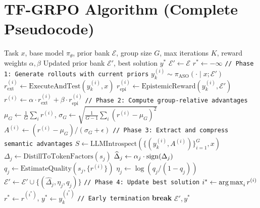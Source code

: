\section{TF-GRPO Algorithm (Complete Pseudocode)}

\label{app:algorithm}

\begin{algorithm}[H]
\caption{Training-Free GRPO with PoE Decoding}
\label{alg:tfgrpo}
\begin{algorithmic}[1]
\Require Task $x$, base model $\pi_\theta$, prior bank $\mathcal{E}$,
         group size $G$, max iterations $K$, reward weights $\alpha, \beta$
\Ensure Updated prior bank $\mathcal{E}'$, best solution $y^*$
\State $\mathcal{E}' \gets \mathcal{E}$
\State $r^* \gets -\infty$
    \State \texttt{// Phase 1: Generate rollouts with current priors}
        \State $y^{(i)}_k \sim \pi_{\text{ASO}}(\cdot \mid x; \mathcal{E}')$
        \State $r_{\text{ext}}^{(i)} \gets \text{ExecuteAndTest}(y^{(i)}_k, x)$
        \State $r_{\text{epi}}^{(i)} \gets \text{EpistemicReward}(y^{(i)}_k, \mathcal{E}')$
        \State $r^{(i)} \gets \alpha \cdot r_{\text{ext}}^{(i)} + \beta \cdot r_{\text{epi}}^{(i)}$
    \EndFor
    \State \texttt{// Phase 2: Compute group-relative advantages}
    \State $\mu_G \gets \frac{1}{G}\sum_i r^{(i)}$, \quad
           $\sigma_G \gets \sqrt{\frac{1}{G-1}\sum_i (r^{(i)} - \mu_G)^2}$
        \State $A^{(i)} \gets (r^{(i)} - \mu_G) / (\sigma_G + \epsilon)$
    \EndFor
    \State \texttt{// Phase 3: Extract and compress semantic advantages}
    \State $S \gets \text{LLMIntrospect}(\{(y^{(i)}_k, A^{(i)})\}_{i=1}^G, x)$
        \State $\Delta_j \gets \text{DistillToTokenFactors}(s_j)$
        \State $\widehat{\Delta}_j \gets \alpha_j \cdot \operatorname{sign}(\Delta_j)$
        \State $q_j \gets \text{EstimateQuality}(s_j, \{r^{(i)}\})$
        \State $\eta_j \gets \log(q_j / (1 - q_j))$
        \State $\mathcal{E}' \gets \mathcal{E}' \cup \{(\widehat{\Delta}_j, \eta_j, q_j)\}$
    \EndFor
    \State \texttt{// Phase 4: Update best solution}
    \State $i^* \gets \operatorname*{arg\,max}_i r^{(i)}$
        \State $r^* \gets r^{(i^*)}$, \quad $y^* \gets y^{(i^*)}_k$
    \EndIf
    \State \texttt{// Early termination}
        \State \textbf{break} 
    \EndIf
\EndFor
\State \Return $\mathcal{E}', y^*$
\end{algorithmic}
\end{algorithm}

